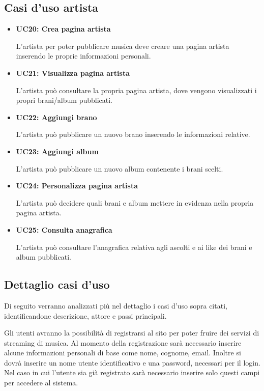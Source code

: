 \subsection{Casi d'uso artista}
\begin{itemize}
      \item \textbf{UC20: Crea pagina artista} 
      
      L'artista per poter pubblicare musica deve creare una pagina artista inserendo le proprie informazioni personali.
      \item  \textbf{UC21: Visualizza pagina artista} 
      
      L'artista può consultare la propria pagina artista, dove vengono visualizzati i propri brani/album pubblicati.
      \item  \textbf{UC22: Aggiungi brano} 
      
      L'artista può pubblicare un nuovo brano inserendo le informazioni relative.
      \item  \textbf{UC23: Aggiungi album} 
      
      L'artista può pubblicare un nuovo album contenente i brani scelti.
      \item  \textbf{UC24: Personalizza pagina artista} 
      
      L'artista può decidere quali brani e album mettere in evidenza nella propria pagina artista.
      \item  \textbf{UC25: Consulta anagrafica} 
      
      L'artista può consultare l'anagrafica relativa agli ascolti e ai like dei brani e album pubblicati.

\end{itemize}


\vspace{1cm}
\subsection{Dettaglio casi d'uso}
Di seguito verranno analizzati più nel dettaglio i casi d’uso sopra citati, identificandone descrizione, attore e passi principali.

Gli utenti avranno la possibilità di registrarsi al sito per poter fruire dei servizi di streaming di musica. Al momento della registrazione sarà necessario inserire alcune informazioni personali di base come nome, cognome, email. Inoltre si dovrà inserire un nome utente identificativo e una password, necessari per il login. Nel caso in cui l’utente sia già registrato sarà necessario inserire solo questi campi per accedere al sistema. 

